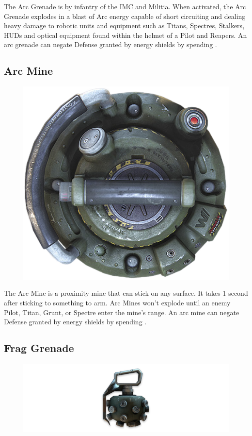\documentclass[9pt, openany]{extbook}
\begin{document}
The Arc Grenade is by infantry of the IMC and Militia. When activated, the Arc Grenade explodes in a blast of Arc energy capable of short circuiting and dealing heavy damage to robotic units and equipment such as Titans, Spectres, Stalkers, HUDs and optical equipment found within the helmet of a Pilot and Reapers. An arc grenade can negate Defense granted by energy shields by spending \Advantage\Advantage.

\subsection{Arc Mine}
\begin{figure}
\vspace*{-2em}\centering
\includegraphics[width=0.5\linewidth]{ArcMine}
\end{figure}

The Arc Mine is a proximity mine that can stick on any surface. It takes 1 second after sticking to something to arm. Arc Mines won't explode until an enemy Pilot, Titan, Grunt, or Spectre enter the mine's range. An arc mine can negate Defense granted by energy shields by spending \Advantage\Advantage.


\subsection{Frag Grenade}
\begin{figure}
\vspace*{-2em}
\includegraphics[width=\linewidth]{FragGrenade}
\end{figure}
\end{document}
